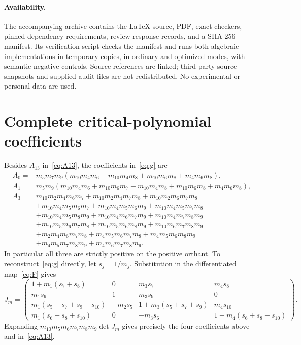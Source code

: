 \documentclass[11pt,a4paper]{article}
\numberwithin{equation}{section}
\theoremstyle{remark}\newtheorem{remark}[theorem]{Remark}
\begin{document}
\paragraph{Availability.}
The accompanying archive contains the LaTeX source, PDF, exact checkers, pinned dependency requirements, review-response records, and a SHA-256 manifest. Its verification script checks the manifest and runs both algebraic implementations in temporary copies, in ordinary and optimized modes, with semantic negative controls. Source references are linked; third-party source snapshots and supplied audit files are not redistributed. No experimental or personal data are used.

\appendix
\section{Complete critical-polynomial coefficients}\label{app:coeff}
Besides $A_{13}$ in~\eqref{eq:A13}, the coefficients in~\eqref{eq:g} are
\begin{align*}
A_0={}&m_5m_7m_9(m_{10}m_4m_6+m_{10}m_4m_8+m_{10}m_6m_8+m_4m_6m_8),\\
A_1={}&m_5m_9(m_{10}m_4m_6+m_{10}m_6m_7+m_{10}m_4m_8
+m_{10}m_6m_8+m_4m_6m_8),\\
A_3={}&m_{10}m_2m_4m_6m_7+m_{10}m_2m_4m_7m_8+m_{10}m_2m_6m_7m_8\\
&+m_{10}m_4m_5m_6m_7+m_{10}m_4m_5m_6m_9+m_{10}m_4m_5m_7m_8\\
&+m_{10}m_4m_5m_8m_9+m_{10}m_4m_6m_7m_9+m_{10}m_4m_7m_8m_9\\
&+m_{10}m_5m_6m_7m_8+m_{10}m_5m_6m_8m_9+m_{10}m_6m_7m_8m_9\\
&+m_2m_4m_6m_7m_8+m_4m_5m_6m_7m_8+m_4m_5m_6m_8m_9\\
&+m_4m_5m_7m_8m_9+m_4m_6m_7m_8m_9.
\end{align*}
In particular all three are strictly positive on the positive orthant. To reconstruct~\eqref{eq:g} directly, let $s_j=1/m_j$. Substitution in the differentiated map~\eqref{eq:F} gives
\[
J_m=\begin{pmatrix}
1+m_1(s_7+s_8)&0&m_3s_7&m_4s_8\\
m_1s_9&1&m_3s_9&0\\
m_1(s_5+s_7+s_9+s_{10})&-m_2s_5&1+m_3(s_5+s_7+s_9)&m_4s_{10}\\
m_1(s_6+s_8+s_{10})&0&-m_3s_6&1+m_4(s_6+s_8+s_{10})
\end{pmatrix}.
\]
Expanding $m_{10}m_5m_6m_7m_8m_9\det J_m$ gives precisely the four coefficients above and in~\eqref{eq:A13}.
\end{document}
